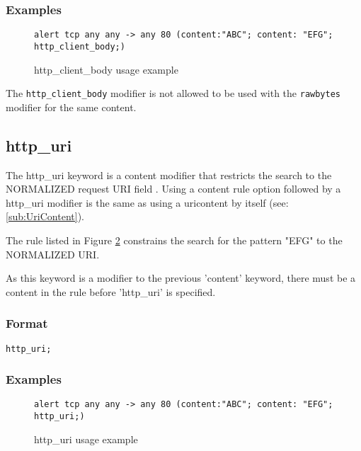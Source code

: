 \documentclass[english]{report}
\newenvironment{note}{
\samepage
    \vspace{10pt}{\textsf{
        {\hspace{7pt}\Huge{$\triangle$\hspace{-12.5pt}{\Large{$^!$}}}}\hspace{5pt}
        {\Large{NOTE}}
    }
    }
   \begin{center}
    \par\vspace{-17pt}

    \begin{lrbox}{\savepar}
    \begin{minipage}[r]{6in}
}
{
    \end{minipage}
    \end{lrbox}
    \fbox{
        \usebox{
            \savepar
	}
    }
    \par\vskip10pt
    \end{center}
}
\newenvironment{note}{
        \begin{rawhtml}
        <p><table border="1"><tr><td><b>
        Note:&nbsp;&nbsp;</b>
        \end{rawhtml}
}{
        \begin{rawhtml}
        </b></td></tr></table></p>
        \end{rawhtml}
}
\begin{document}
\subsubsection{Examples}

\begin{figure}[!hbpt]
\begin{verbatim}
alert tcp any any -> any 80 (content:"ABC"; content: "EFG"; http_client_body;)
\end{verbatim}
\caption{http\_client\_body usage example \label{fig:HttpClientBody}}
\end{figure}

\begin{note}
The \texttt{http\_client\_body} modifier is not allowed to be used with
the \texttt{rawbytes} modifier for the same content.
\end{note}


\subsection{http\_uri\label{sub:HttpUri}}

The http\_uri keyword is a content modifier that restricts
the search to the NORMALIZED request \textsc{URI} field .  Using a
content rule option followed by a http\_uri modifier is the
same as using a uricontent by itself (see: \ref{sub:UriContent}).

The rule listed in Figure \ref{fig:HttpUri} constrains the
search for the pattern "EFG" to the NORMALIZED URI.

As this keyword is a modifier to the previous 'content' keyword, there must be
a content in the rule before 'http\_uri' is specified.

\subsubsection{Format}

\begin{verbatim}
http_uri;
\end{verbatim}

\subsubsection{Examples}

\begin{figure}[!hbpt]
\begin{verbatim}
alert tcp any any -> any 80 (content:"ABC"; content: "EFG"; http_uri;)
\end{verbatim}
\caption{http\_uri usage example \label{fig:HttpUri}}
\end{figure}
\end{document}
